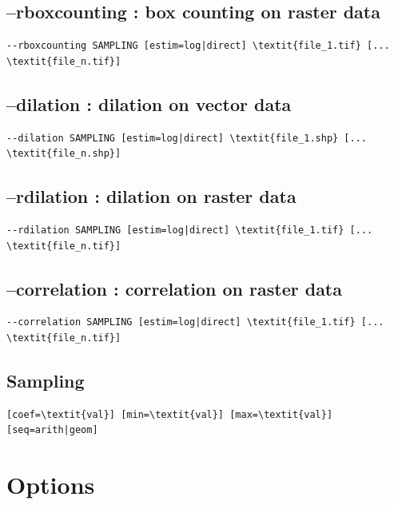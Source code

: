 \documentclass[a4paper,10pt]{report}
\begin{document}
\subsection{--rboxcounting : box counting on raster data}
\begin{Verbatim}[commandchars=\\\{\}]
--rboxcounting SAMPLING [estim=log|direct] \textit{file_1.tif} [... \textit{file_n.tif}]
\end{Verbatim}

\subsection{--dilation : dilation on vector data}
\begin{Verbatim}[commandchars=\\\{\}]
--dilation SAMPLING [estim=log|direct] \textit{file_1.shp} [... \textit{file_n.shp}]
\end{Verbatim}

\subsection{--rdilation : dilation on raster data}
\begin{Verbatim}[commandchars=\\\{\}]
--rdilation SAMPLING [estim=log|direct] \textit{file_1.tif} [... \textit{file_n.tif}]
\end{Verbatim}

\subsection{--correlation : correlation on raster data}
\begin{Verbatim}[commandchars=\\\{\}]
--correlation SAMPLING [estim=log|direct] \textit{file_1.tif} [... \textit{file_n.tif}]
\end{Verbatim}

\subsection{Sampling}
\begin{Verbatim}[commandchars=\\\{\}]
[coef=\textit{val}] [min=\textit{val}] [max=\textit{val}] [seq=arith|geom]
\end{Verbatim}

\section{Options}
\end{document}
